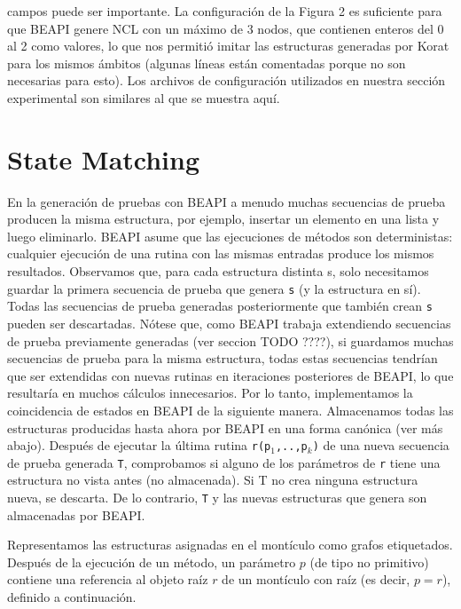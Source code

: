 campos puede ser importante. La configuración de la Figura 2 es suficiente para que \textsf{BEAPI} genere NCL con un máximo de 3 nodos, que contienen enteros del 0 al 2 como valores, lo que nos permitió imitar las estructuras generadas por Korat para los mismos ámbitos (algunas líneas están comentadas porque no son necesarias para esto). Los archivos de configuración utilizados en nuestra sección experimental son similares al que se muestra aquí.




\section{State Matching}

En la generación de pruebas con \textsf{BEAPI} a menudo muchas secuencias de prueba producen la misma estructura, por ejemplo, insertar un elemento en una lista y luego eliminarlo. \textsf{BEAPI} asume que las ejecuciones de métodos son deterministas: cualquier ejecución de una rutina con las mismas entradas produce los mismos resultados. Observamos que, para cada estructura distinta s, solo necesitamos guardar la primera secuencia de prueba que genera \texttt{s} (y la estructura en sí). Todas las secuencias de prueba generadas posteriormente que también crean \texttt{s} pueden ser descartadas. Nótese que, como \textsf{BEAPI} trabaja extendiendo secuencias de prueba previamente generadas (ver seccion TODO ????), si guardamos muchas secuencias de prueba para la misma estructura, todas estas secuencias tendrían que ser extendidas con nuevas rutinas en iteraciones posteriores de \textsf{BEAPI}, lo que resultaría en muchos cálculos innecesarios. Por lo tanto, implementamos la coincidencia de estados en \textsf{BEAPI} de la siguiente manera. Almacenamos todas las estructuras producidas hasta ahora por \textsf{BEAPI} en una forma canónica (ver más abajo). Después de ejecutar la última rutina \texttt{r(p$_1$,..,p$_k$)} de una nueva secuencia de prueba generada \texttt{T}, comprobamos si alguno de los parámetros de \texttt{r} tiene una estructura no vista antes (no almacenada). Si T no crea ninguna estructura nueva, se descarta. De lo contrario, \texttt{T} y las nuevas estructuras que genera son almacenadas por \textsf{BEAPI}.

Representamos las estructuras asignadas en el montículo como grafos etiquetados. Después de la ejecución de un método, un parámetro $p$  (de tipo no primitivo) contiene una referencia al objeto raíz $r$ de un montículo con raíz (es decir,  $p=r$), definido a continuación.

